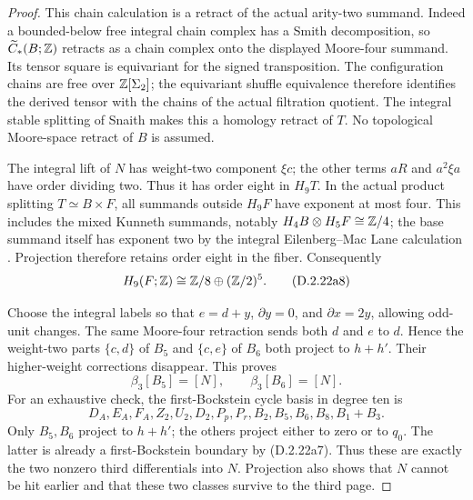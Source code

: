 \begin{proof}
This chain calculation is a retract of the actual arity-two
summand. Indeed a bounded-below free integral chain complex
has a Smith decomposition, so $\widetilde C_*(B;\mathbb Z)$ retracts
as a chain complex onto the displayed Moore-four summand.
Its tensor square is equivariant for the signed transposition.
The configuration chains are free over $\mathbb Z[\Sigma_2]$;
the equivariant shuffle equivalence therefore identifies the
derived tensor with the chains of the actual filtration quotient.
The integral stable splitting of Snaith
\cite[Theorem 1.1 and Section 2]{Snaith1974} makes this a
homology retract of $T$. No topological Moore-space retract
of $B$ is assumed.

The integral lift of $N$ has weight-two component $\xi c$;
the other terms $aR$ and $a^2\xi a$ have order dividing two.
Thus it has order eight in $H_9T$. In the actual product splitting
$T\simeq B\times F$, all summands outside $H_9F$ have exponent
at most four. This includes the mixed Kunneth summands, notably
$H_4B\otimes H_5F\cong\mathbb Z/4$; the base summand itself has
exponent two by the integral Eilenberg--Mac Lane calculation
\cite[\S3.2]{I_Clement2002}. Projection therefore retains order eight in the
fiber. Consequently
\[
 H_9(F;\mathbb Z)\cong\mathbb Z/8\oplus(\mathbb Z/2)^5.
 \tag{D.2.22a8}
\]

Choose the integral labels so that $e=d+y$, $\partial y=0$,
and $\partial x=2y$, allowing odd-unit changes. The same
Moore-four retraction sends both $d$ and $e$ to $d$.
Hence the weight-two parts $\{c,d\}$ of $B_5$ and
$\{c,e\}$ of $B_6$ both project to $h+h'$.
Their higher-weight corrections disappear. This proves
\[
 \beta_3[B_5]=[N],\qquad \beta_3[B_6]=[N].
 \tag{D.2.22a9}
\]
For an exhaustive check, the first-Bockstein cycle basis in
degree ten is
\[
 D_A,E_A,F_A,Z_2,U_2,D_2,P_p,P_r,
 B_2,B_5,B_6,B_8,B_1+B_3.
\]
Only $B_5,B_6$ project to $h+h'$; the others project either
to zero or to $q_0$. The latter is already a first-Bockstein
boundary by \textup{(D.2.22a7)}. Thus these are exactly the
two nonzero third differentials into $N$. Projection also
shows that $N$ cannot be hit earlier and that these two
classes survive to the third page.


\end{proof}
